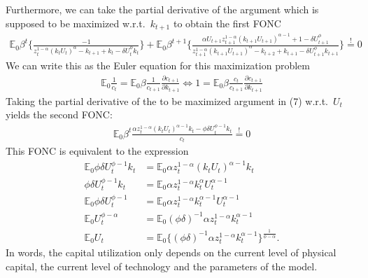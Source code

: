 \documentclass[a4paper]{article}
\theoremstyle{definition}
\begin{document}
Furthermore, we can take the partial derivative of the argument which is supposed to be maximized w.r.t.\ $k_{t+1}$ to obtain the first FONC
	\begin{align*}
	\mathbb E_0 \beta^t \Big\{ \frac{-1}{z_t^{1-\alpha}(k_t U_t)^\alpha - k_{t+1} + k_t - \delta U_t^\phi k_t} \Big\} + \mathbb E_0 \beta^{t+1} \Big\{ \frac{\alpha U_{t+1} z_{t+1}^{1-\alpha}(k_{t+1}U_{t+1})^{\alpha-1} + 1 - \delta U_{t+1}^\phi}{z_{t+1}^{1-\alpha}(k_{t+1}U_{t+1})^\alpha-k_{t+2}+k_{t+1}-\delta U_{t+1}^\phi k_{t+1}} \Big\} \overset{!}{=} 0 
	\end{align*}
We can write this as the Euler equation for this maximization problem
	\begin{align*}
	\mathbb E_0 \frac{1}{c_t} = \mathbb E_0 \beta \frac{1}{c_{t+1}} \frac{\partial c_{t+1}}{\partial k_{t+1}} \Leftrightarrow 1 = \mathbb E_0 \beta \frac{c_{t}}{c_{t+1}} \frac{\partial c_{t+1}}{\partial k_{t+1}}
	\end{align*}
Taking the partial derivative of the to be maximized argument in (7) w.r.t.\ $U_t$ yields the second FONC:
	\begin{align*}
	\mathbb E_0 \beta^t \frac{\alpha z_t^{1-\alpha}(k_t U_t)^{\alpha-1}k_t- \phi \delta U_t^{\phi-1}k_t}{c_t} \overset{!}{=} 0
	\end{align*}
This FONC is equivalent to the expression
	\begin{align*}
	\mathbb E_0 \phi \delta U_t^{\phi-1}k_t 	&= \mathbb E_0 \alpha z_t^{1-\alpha}(k_t U_t)^{\alpha-1}k_t \\
	\phi \delta U_t^{\phi-1}k_t 	&= \mathbb E_0 \alpha z_t^{1-\alpha} k_t^{\alpha}U_t^{\alpha-1} \\
	\mathbb E_0 \phi \delta U_t^{\phi-1} 		&=\mathbb E_0 \alpha z_t^{1-\alpha} k_t^{\alpha-1} U_t^{\alpha-1} \\
	\mathbb E_0 U_t^{\phi-\alpha} 				&=\mathbb E_0  (\phi \delta)^{-1}  \alpha z_t^{1-\alpha} k_t^{\alpha-1} \\
	\mathbb E_0 U_t 								&=\mathbb E_0  \Big\{ (\phi \delta)^{-1}  \alpha z_t^{1-\alpha} k_t^{\alpha-1} \Big\}^{\frac{1}{\phi-\alpha}}.
	\end{align*}
In words, the capital utilization only depends on the current level of physical capital, the current level of technology and the parameters of the model. 
\end{document}
